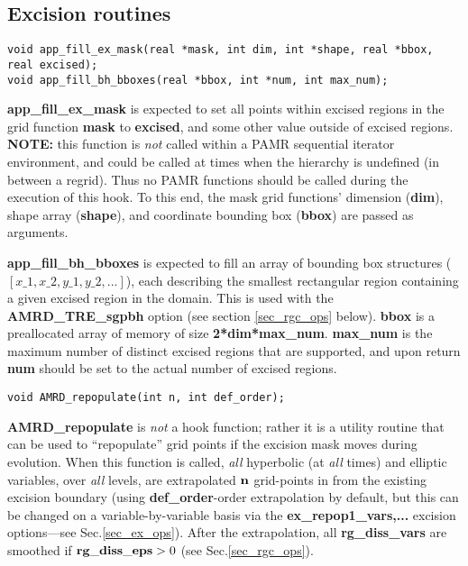 \documentclass[aps,amssymb,unsortedaddress,nofootinbib]{revtex4}
\begin{document}
\subsection{Excision routines}\label{sec_ex_fncs}

\begin{verbatim}
void app_fill_ex_mask(real *mask, int dim, int *shape, real *bbox, real excised); 
void app_fill_bh_bboxes(real *bbox, int *num, int max_num);
\end{verbatim}

{\bf app\_fill\_ex\_mask} is expected to set all points within excised regions in the
grid function {\bf mask} to {\bf excised}, and some other value outside of excised regions.
{\bf NOTE:} this function is {\em not} called within a PAMR sequential iterator environment,
and could be called at times when the hierarchy is undefined (in between a regrid). Thus
no PAMR functions should be called during the execution of this hook. To this end,
the mask grid functions' dimension ({\bf dim}), shape array ({\bf shape}), and coordinate bounding
box ({\bf bbox}) are passed as arguments.\par
{\bf app\_fill\_bh\_bboxes} is expected to fill an array of bounding box 
structures ($[x\_1,x\_2,y\_1,y\_2,...]$),
each describing the smallest rectangular region containing a given excised region
in the domain. This is used with the {\bf AMRD\_TRE\_sgpbh} option (see section \ref{sec_rgc_ops} below).
{\bf bbox} is a preallocated array of memory of size {\bf 2*dim*max\_num}. {\bf max\_num} is
the maximum number of distinct excised regions that are supported, and upon return {\bf num}
should be set to the actual number of excised regions.

\begin{verbatim}
void AMRD_repopulate(int n, int def_order);
\end{verbatim}

{\bf AMRD\_repopulate} is {\em not} a hook function; rather it is a utility routine
that can be used to ``repopulate'' grid points if the excision mask moves during
evolution. When this function is called, {\em all} hyperbolic (at {\em all} times) and elliptic variables,
over {\em all} levels,
are extrapolated $\bf n$ grid-points in from the existing excision boundary
(using {\bf def\_order}-order extrapolation by default,
but this can be changed on a variable-by-variable basis via the {\bf ex\_repop1\_vars,...}
excision options---see Sec.\ref{sec_ex_ops}). After the extrapolation, all
{\bf rg\_diss\_vars} are smoothed if ${\bf rg\_diss\_eps}>0$ (see Sec.\ref{sec_rgc_ops}).
\end{document}
